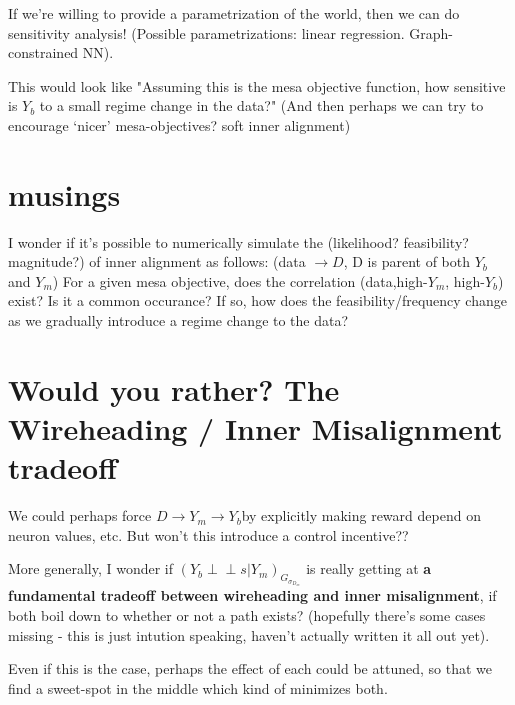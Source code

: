 \documentclass[letterpaper,10pt]{article}
\newcommand\indep{\perp \!\!\! \perp}
\begin{document}
If we're willing to provide a parametrization of the world, then we can do sensitivity analysis! (Possible parametrizations: linear regression. Graph-constrained NN).

This would look like "Assuming this is the mesa objective function, how sensitive is $Y_b$ to a small regime change in the data?"
(And then perhaps we can try to encourage `nicer' mesa-objectives? soft inner alignment)

\section{musings}
I wonder if it's possible to numerically simulate the (likelihood? feasibility? magnitude?) of inner alignment as follows:
(data $\rightarrow D$, D is parent of both $Y_b$ and $Y_m$)
For a given mesa objective, does the correlation (data,high-$Y_m$, high-$Y_b$) exist? Is it a common occurance?
If so, how does the feasibility/frequency change as we gradually introduce a regime change to the data?


\section{Would you rather? The Wireheading / Inner Misalignment tradeoff}
We could perhaps force $D\rightarrow Y_m\rightarrow Y_b$by explicitly making reward depend on neuron values, etc. But won't this introduce a control incentive??

More generally, I wonder if $(Y_b\indep s|Y_m)_{G_{\sigma_{D_m}}}$ is really getting at \textbf{a fundamental tradeoff between wireheading and inner misalignment}, if both boil down to whether or not a path exists? (hopefully there's some cases missing - this is just intution speaking, haven't actually written it all out yet).

Even if this is the case, perhaps the effect of each could be attuned, so that we find a sweet-spot in the middle which kind of minimizes both.






\end{document}

